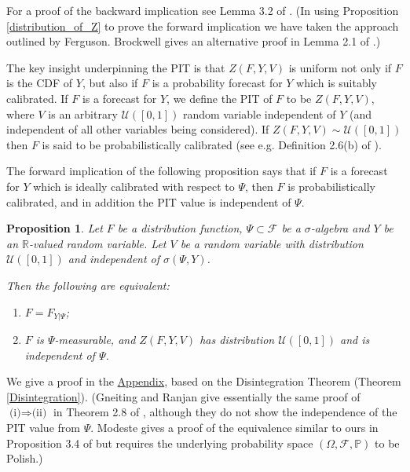 \documentclass[aap]{imsart}
\theoremstyle{plain}
\newtheorem{proposition}[theorem]{Proposition}
\theoremstyle{definition}
\begin{document}
For a proof of the backward implication see Lemma 3.2 of \cite{Mds23}. (In using Proposition \ref{distribution_of_Z} to prove the forward implication we have taken the approach outlined by Ferguson. Brockwell gives an alternative proof in Lemma 2.1 of \cite{Brc07}.)

The key insight underpinning the PIT is that $Z(F, Y, V)$ is uniform not only if $F$ is the CDF of $Y$, but also if $F$ is a probability forecast for $Y$ which is suitably calibrated. If $F$ is a forecast for $Y$, we define the PIT of $F$ to be $Z(F, Y, V)$, where $V$ is an arbitrary $\mathcal{U}([0,1])$ random variable independent of $Y$ (and independent of all other variables being considered). If $Z(F, Y, V) \sim \mathcal{U}([0,1])$ then $F$ is said to be probabilistically calibrated (see e.g. Definition 2.6(b) of \cite{Gnt13}).

The forward implication of the following proposition says that if $F$ is a forecast for $Y$ which is ideally calibrated with respect to $\Psi$, then $F$ is probabilistically calibrated, and in addition the PIT value is independent of $\Psi$.

\begin{proposition}\label{auto-calibration_PIT}
  Let $F$ be a distribution function, $\Psi \subset \mathcal{F}$ be a $\sigma$-algebra and $Y$ be an $\mathbb{R}$-valued random variable. Let $V$ be a random variable with distribution $\mathcal{U}([0,1])$ and independent of $\sigma(\Psi, Y)$.

  Then the following are equivalent:
\begin{enumerate}[label=(\roman*)]
  \item $F = F_{Y|\Psi}$;
  \item $F$ is $\Psi$-measurable, and $Z(F,Y,V)$ has distribution $\mathcal{U}([0,1])$ and is independent of $\Psi$.
\end{enumerate}
\end{proposition}
We give a proof in the \hyperref[appn]{Appendix}, based on the Disintegration Theorem (Theorem \ref{Disintegration}). (Gneiting and Ranjan give essentially the same proof of $\text{(i)} \Rightarrow \text{(ii)}$ in Theorem 2.8 of \cite{Gnt13}, although they do not show the independence of the PIT value from $\Psi$. Modeste gives a proof of the equivalence similar to ours in Proposition 3.4 of \cite{Mds23} but requires the underlying probability space $(\Omega, \mathcal{F}, \mathbb{P})$ to be Polish.)
\end{document}
